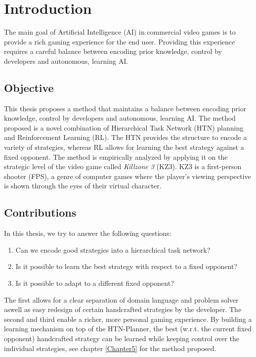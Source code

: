\chapter{Introduction} %
\label{Chapter1}
The main goal of Artificial Intelligence (AI) in commercial video games is to
provide a rich gaming experience for the end user. Providing this experience
requires a careful balance between encoding prior knowledge, control by
developers and autonomous, learning AI. 

\section{Objective}
This thesis proposes a method that maintains a balance between encoding prior
knowledge, control by developers and autonomous, learning AI. The method
proposed is a novel combination of Hierarchical Task Network (HTN) planning and
Reinforcement Learning (RL). The HTN provides the structure to encode a variety
of strategies, whereas RL allows for learning the best strategy against a fixed
opponent. The method is empirically analyzed by applying it on the strategic
level of the video game called \emph{Killzone 3} (KZ3). KZ3 is a first-person
shooter (FPS), a genre of computer games where the player's viewing perspective
is shown through the eyes of their virtual character.

\section{Contributions}
In this thesis, we try to answer the following questions:
\begin{enumerate}
\item{Can we encode good strategies into a hierarchical task network?}
\item{Is it possible to learn the best strategy with respect to a fixed opponent?}
\item{Is it possible to adapt to a different fixed opponent?} 
\end{enumerate}
The first allows for a clear separation of domain language and problem solver
aswell as easy redesign of certain handcrafted strategies by the developer. The
second and third enable a richer, more personal gaming experience. By building
a learning mechanism on top of the HTN-Planner, the best (w.r.t. the current
fixed opponent) handcrafted strategy can be learned while keeping control over
the individual strategies, see chapter \ref{Chapter5} for the method proposed.

